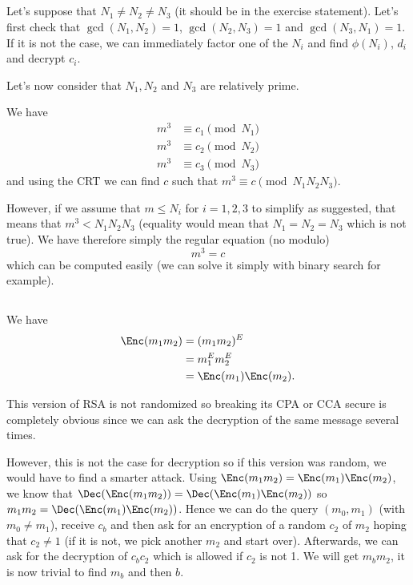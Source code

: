 \subsection{}
\begin{solution}
  Let's suppose that $N_1 \neq N_2 \neq N_3$ (it should be in the exercise statement).
  Let's first check that $\gcd(N_1,N_2) = 1$, $\gcd(N_2,N_3) = 1$ and $\gcd(N_3,N_1) = 1$.
  If it is not the case, we can immediately factor one of the $N_i$ and find $\phi(N_i)$, $d_i$ and decrypt $c_i$.

  Let's now consider that $N_1, N_2$ and $N_3$ are relatively prime.

  We have
  \begin{align*}
    m^3 & \equiv c_1 \pmod{N_1}\\
    m^3 & \equiv c_2 \pmod{N_2}\\
    m^3 & \equiv c_3 \pmod{N_3}
  \end{align*}
  and using the CRT we can find $c$ such that $m^3 \equiv c \pmod{N_1N_2N_3}$.

  However, if we assume that $m \leq N_i$ for $i = 1, 2, 3$ to simplify as suggested,
  that means that $m^3 < N_1N_2N_3$ (equality would mean that $N_1=N_2=N_3$ which is not true).
  We have therefore simply the regular equation (no modulo)
  \[ m^3 = c \]
  which can be computed easily (we can solve it simply with binary search for example).
\end{solution}

\subsection{}
\begin{solution}
  We have
  \begin{align*}
    \Enc(m_1m_2)
    & = (m_1m_2)^E\\
    & = m_1^Em_2^E\\
    & = \Enc(m_1)\Enc(m_2).
  \end{align*}

  This version of RSA is not randomized so breaking its CPA or CCA secure is completely obvious since we can ask
  the decryption of the same message several times.

  However, this is not the case for decryption so if this version was random, we would have to find a smarter attack.
  Using $\Enc(m_1 m_2) = \Enc(m_1)\Enc(m_2)$, we know that $\Dec(\Enc(m_1 m_2)) = \Dec(\Enc(m_1)\Enc(m_2))$ so
  $m_1 m_2 = \Dec(\Enc(m_1)\Enc(m_2))$.
  Hence we can do the query $(m_0,m_1)$ (with $m_0 \neq m_1$), receive $c_b$ and then ask for an encryption of a random $c_2$ of $m_2$ hoping that $c_2 \neq 1$ (if it is not, we pick another $m_2$ and start over).
  Afterwards, we can ask for the decryption of $c_bc_2$ which is allowed if $c_2$ is not 1.
  We will get $m_bm_2$, it is now trivial to find $m_b$ and then $b$.
\end{solution}

\subsection{}
